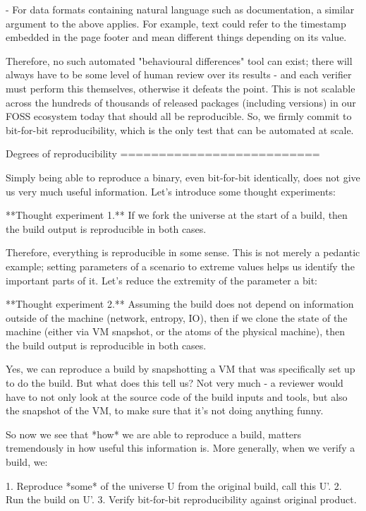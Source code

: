 - For data formats containing natural language such as documentation, a similar
  argument to the above applies. For example, text could refer to the timestamp
  embedded in the page footer and mean different things depending on its value.

Therefore, no such automated "behavioural differences" tool can exist; there
will always have to be some level of human review over its results - and each
verifier must perform this themselves, otherwise it defeats the point. This is
not scalable across the hundreds of thousands of released packages (including
versions) in our FOSS ecosystem today that should all be reproducible. So, we
firmly commit to bit-for-bit reproducibility, which is the only test that can
be automated at scale.

Degrees of reproducibility
==========================

Simply being able to reproduce a binary, even bit-for-bit identically, does not
give us very much useful information. Let's introduce some thought experiments:

**Thought experiment 1.** If we fork the universe at the start of a build, then
the build output is reproducible in both cases.

Therefore, everything is reproducible in some sense. This is not merely a
pedantic example; setting parameters of a scenario to extreme values helps us
identify the important parts of it. Let's reduce the extremity of the parameter
a bit:

**Thought experiment 2.** Assuming the build does not depend on information
outside of the machine (network, entropy, IO), then if we clone the state of
the machine (either via VM snapshot, or the atoms of the physical machine),
then the build output is reproducible in both cases.

Yes, we can reproduce a build by snapshotting a VM that was specifically set up
to do the build. But what does this tell us? Not very much - a reviewer would
have to not only look at the source code of the build inputs and tools, but
also the snapshot of the VM, to make sure that it's not doing anything funny.

So now we see that *how* we are able to reproduce a build, matters tremendously
in how useful this information is. More generally, when we verify a build, we:

1. Reproduce *some* of the universe U from the original build, call this U'.
2. Run the build on U'.
3. Verify bit-for-bit reproducibility against original product.

